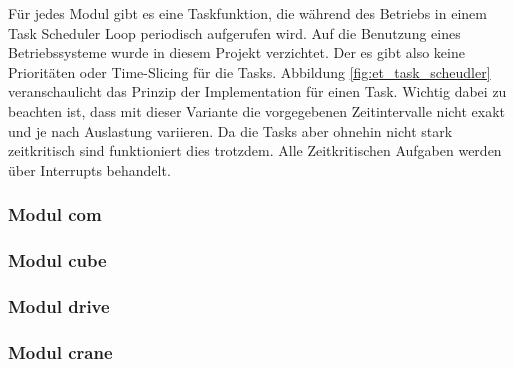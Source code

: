 \documentclass[../../main.tex]{subfiles}
\begin{document}
    Für jedes Modul gibt es eine Taskfunktion, die während des Betriebs in einem Task Scheduler Loop periodisch aufgerufen wird. Auf die Benutzung eines Betriebssysteme wurde in diesem Projekt verzichtet. Der es gibt also keine Prioritäten oder Time-Slicing für die Tasks. Abbildung \ref{fig:et_task_scheudler} veranschaulicht das Prinzip der Implementation für einen Task. Wichtig dabei zu beachten ist, dass mit dieser Variante die vorgegebenen Zeitintervalle nicht exakt und je nach Auslastung variieren. Da die Tasks aber ohnehin nicht stark zeitkritisch sind funktioniert dies trotzdem. Alle Zeitkritischen Aufgaben werden über Interrupts behandelt.

    \subsubsection{Modul com}

    \subsubsection{Modul cube}
    
    \subsubsection{Modul drive}

    \subsubsection{Modul crane}

    
\end{document}

